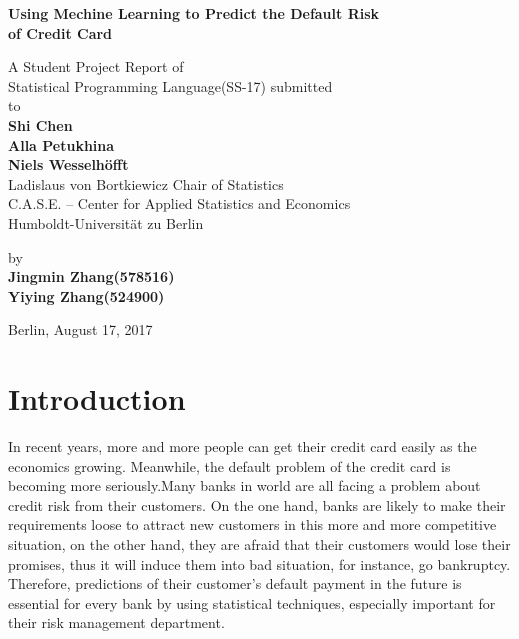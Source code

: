 \documentclass[a4paper,11pt]{article}
\begin{document}
	\thispagestyle{empty}
\begin{center}
	
	{\Large{\bf Using Mechine Learning to Predict the Default Risk \\of Credit Card}} \vspace{0.5cm}
	
	
	{\normalsize A Student Project Report of \\Statistical Programming Language(SS-17) submitted\\\vspace{0.5cm}
		to}\\\vspace{0.5cm}
	{\normalsize{\bf Shi Chen\\
			Alla Petukhina\\
			Niels Wesselh\"offt
	}} \\\vspace{0.5cm}
	{\normalsize Ladislaus von Bortkiewicz Chair of Statistics\\
		C.A.S.E. – Center for Applied Statistics and Economics\\
		Humboldt-Universit\"at zu Berlin
	} \vspace{1cm}
	
	
	{\normalsize by \\\vspace{0.5cm}
		{\bf Jingmin Zhang(578516)\\
			Yiying Zhang(524900)} \\
	} \vspace{1cm}
	
	
	{\normalsize 
		Berlin, August 17, 2017}
	
\end{center}

\newpage
\tableofcontents
\clearpage

\newpage
\pagestyle{plain}
\setcounter{page}{1}    %

\section{Introduction}
 In recent years, more and more people can get their credit card easily as the economics growing. Meanwhile, the default problem of the credit card is becoming more seriously.Many banks in world are all facing a problem about credit risk from their customers. On the one hand, banks are likely to make their requirements loose to attract new customers in this more and more competitive situation, on the other hand, they are afraid that their customers would lose their promises, thus it will induce them into bad situation, for instance, go bankruptcy. Therefore, predictions of their customer’s default payment in the future is essential for every bank by using statistical techniques, especially important for their risk management department. 
 
\end{document}
